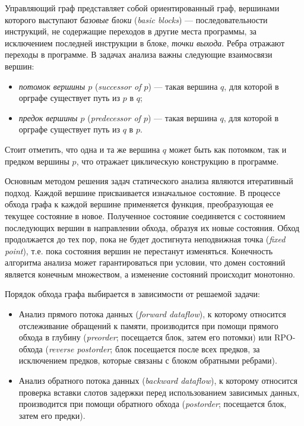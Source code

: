 \documentclass[a4paper,14pt]{extarticle}
\newenvironment{ul}{\begin{itemize}[noitemsep,topsep=0em]}{\end{itemize}\vspace{20pt}}
\newenvironment{inlineul}{\begin{itemize}[noitemsep,topsep=0em]}{\end{itemize}}
\begin{document}
Управляющий граф\cite{cfg-allen}\cite{cfg-ru} представляет собой ориентированный граф, вершинами которого
выступают \textit{базовые блоки} (\textit{basic blocks}) — последовательности инструкций,
не содержащие переходов в другие места программы, за исключением последней
инструкции в блоке, \textit{точки выхода}. Ребра отражают переходы в программе.
В задачах анализа важны следующие взаимосвязи вершин:
\begin{inlineul}
\item \textit{потомок вершины $p$} (\textit{successor of $p$}) — такая вершина $q$,
  для которой в орграфе существует путь из $p$ в $q$;
\item \textit{предок вершины $p$} (\textit{predecessor of $p$}) — такая вершина $q$,
  для которой в орграфе существует путь из $q$ в $p$.
\end{inlineul}
Стоит отметить, что одна и та же вершина $q$ может быть как потомком, так и предком вершины $p$,
что отражает циклическую конструкцию в программе.

Основным методом решения задач статического анализа являются итеративный подход\cite[Глава~8]{compilers}.
Каждой вершине присваивается изначальное состояние. В процессе обхода графа к каждой вершине
применяется функция, преобразующая ее текущее состояние в новое. Полученное состояние
соединяется с состоянием последующих вершин в направлении обхода, образуя их новые состояния.
Обход продолжается до тех пор, пока не будет достигнута неподвижная точка (\textit{fixed point}), т.е.
пока состояния вершин не перестанут изменяться. Конечность алгоритма анализа может гарантироваться
при условии, что домен состояний является конечным множеством, а изменение состояний происходит монотонно.

Порядок обхода графа выбирается в зависимости от решаемой задачи:
\begin{ul}
\item Анализ прямого потока данных (\textit{forward dataflow}), к которому относится отслеживание обращений
  к памяти, производится при помощи прямого обхода в глубину (\textit{preorder}; посещается блок, затем его потомки) или RPO-обхода (\textit{reverse postorder}; блок посещается после всех предков, за исключением предков, которые связаны с блоком обратными ребрами).

\item Анализ обратного потока данных (\textit{backward dataflow}), к которому относится проверка вставки
слотов задержки перед использованием зависимых данных, производится при помощи обратного обхода
(\textit{postorder}; посещается блок, затем его предки).
\end{ul}
\end{document}
